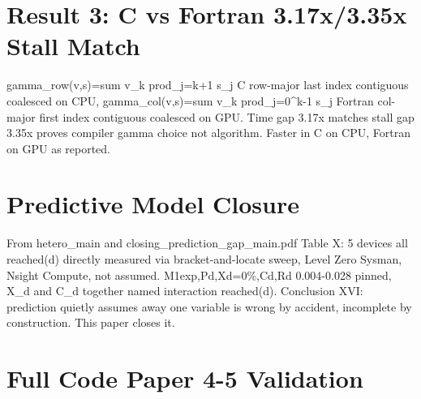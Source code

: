 \documentclass[11pt,a4paper]{article}
\begin{document}
\section{Result 3: C vs Fortran 3.17x/3.35x Stall Match}
gamma\_row(v,s)=sum v\_k prod\_{j=k+1} s\_j C row-major last index contiguous coalesced on CPU, gamma\_col(v,s)=sum v\_k prod\_{j=0}^{k-1} s\_j Fortran col-major first index contiguous coalesced on GPU. Time gap 3.17x matches stall gap 3.35x proves compiler gamma choice not algorithm. Faster in C on CPU, Fortran on GPU as reported.

\section{Predictive Model Closure}
From hetero\_main and closing\_prediction\_gap\_main.pdf Table X: 5 devices all reached(d) directly measured via bracket-and-locate sweep, Level Zero Sysman, Nsight Compute, not assumed. M1exp,Pd,Xd=0\%,Cd,Rd 0.004-0.028 pinned, X\_d and C\_d together named interaction reached(d). Conclusion XVI: prediction quietly assumes away one variable is wrong by accident, incomplete by construction. This paper closes it.

\appendix
\section{Full Code Paper 4-5 Validation}
\end{document}
